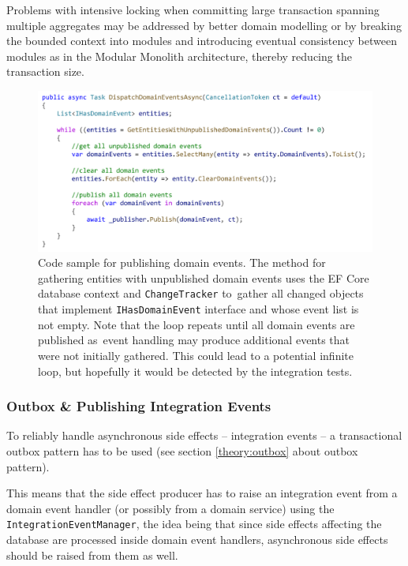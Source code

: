 Problems with intensive locking when committing large transaction spanning multiple aggregates may be addressed by better domain modelling or by breaking the bounded context into modules and introducing eventual consistency between modules as in the Modular Monolith architecture, thereby reducing the transaction size.

\begin{figure} [H]
    \centering
    \includegraphics[width=\textwidth]{figures/dispatch-domain.pdf}
    \caption{Code sample for publishing domain events. The method for gathering entities with unpublished domain events uses the EF Core database context and \texttt{ChangeTracker} to~gather all changed objects that implement \texttt{IHasDomainEvent} interface and whose event list is not empty. Note that the loop repeats until all domain events are published as~event handling may produce additional events that were not initially gathered. This could lead to a potential infinite loop, but hopefully it would be detected by the integration tests.}
    \label{fig:dispatch_domain_events}
\end{figure}

\subsubsection{Outbox \& Publishing Integration Events}
To reliably handle asynchronous side effects -- integration events -- a transactional outbox pattern has to be used (see section \ref{theory:outbox} about outbox pattern).

This means that the side effect producer has to raise an integration event from a domain event handler (or possibly from a domain service) using the \texttt{IntegrationEventManager}, the idea being that since side effects affecting the database are processed inside domain event handlers, asynchronous side effects should be raised from them as well.

